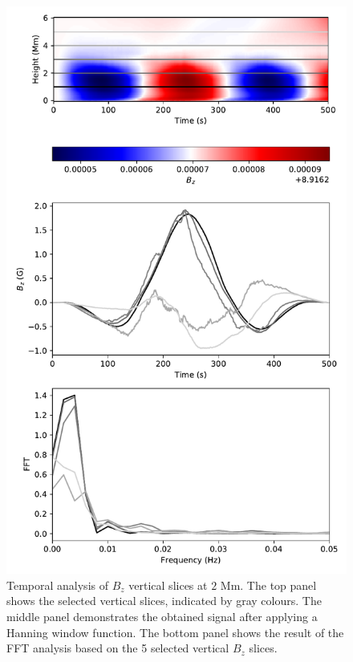 \documentclass[physics,article,submit,pdftex,moreauthors]{Definitions/mdpi}
\begin{document}
\begin{figure}
    \centering
    \label{fft_sim1}
    \includegraphics[scale=0.55]{fft_sim.pdf}
    \caption{Temporal analysis of $B_{z}$ vertical slices at $2$ Mm. The top panel shows the selected vertical slices, indicated by gray colours. The middle panel demonstrates the obtained signal after applying a Hanning window function. The bottom panel shows the result of the FFT analysis based on the 5 selected vertical $B_{z}$ slices.}

\end{figure}
\end{document}
